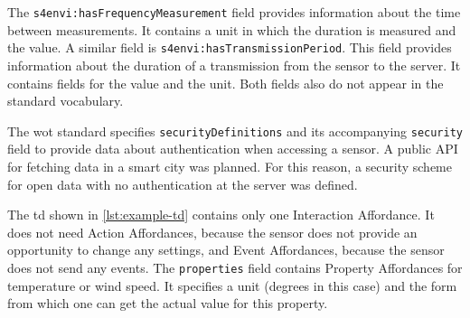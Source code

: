 The \lstinline|s4envi:hasFrequencyMeasurement| field provides information about the time between measurements. It contains a unit in which the duration is measured and the value. A similar field is \lstinline|s4envi:hasTransmissionPeriod|. This field provides information about the duration of a transmission from the sensor to the server. It contains fields for the value and the unit. Both fields also do not appear in the standard vocabulary.

The \gls{wot} standard specifies \lstinline|securityDefinitions| and its accompanying \lstinline|security| field to provide data about authentication when accessing a sensor. A public API for fetching data in a smart city was planned. For this reason, a security scheme for open data with no authentication at the server was defined.

The \gls{td} shown in \autoref{lst:example-td} contains only one Interaction Affordance. It does not need Action Affordances, because the sensor does not provide an opportunity to change any settings, and Event Affordances, because the sensor does not send any events. The \lstinline|properties| field contains Property Affordances for temperature or wind speed. It specifies a unit (degrees in this case) and the form from which one can get the actual value for this property.
